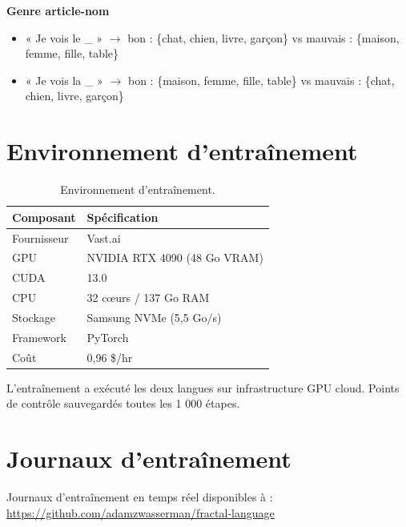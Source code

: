 \documentclass[11pt,a4paper]{article}
\begin{document}
\textbf{Genre article-nom}
\begin{itemize}
    \item « Je vois le \_ » $\rightarrow$ bon : \{chat, chien, livre, garçon\} vs mauvais : \{maison, femme, fille, table\}
    \item « Je vois la \_ » $\rightarrow$ bon : \{maison, femme, fille, table\} vs mauvais : \{chat, chien, livre, garçon\}
\end{itemize}

\section{Environnement d'entraînement}

\begin{table}[H]
\centering
\begin{tabular}{ll}
\toprule
\textbf{Composant} & \textbf{Spécification} \\
\midrule
Fournisseur & Vast.ai \\
GPU & NVIDIA RTX 4090 (48 Go VRAM) \\
CUDA & 13.0 \\
CPU & 32 c\oe urs / 137 Go RAM \\
Stockage & Samsung NVMe (5,5 Go/s) \\
Framework & PyTorch \\
Coût & 0,96 \$/hr \\
\bottomrule
\end{tabular}
\caption{Environnement d'entraînement.}
\label{tab:environment}
\end{table}

L'entraînement a exécuté les deux langues sur infrastructure GPU cloud. Points de contrôle sauvegardés toutes les 1 000 étapes.

\section{Journaux d'entraînement}

Journaux d'entraînement en temps réel disponibles à : \url{https://github.com/adamzwasserman/fractal-language}
\end{document}
